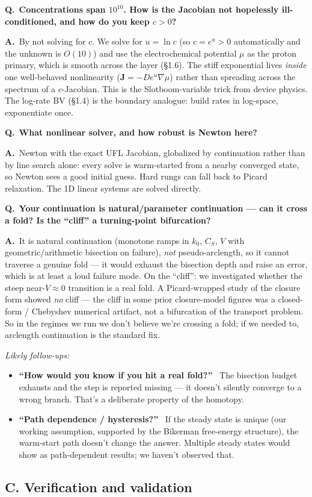 \documentclass[11pt]{article}
\newcommand{\CS}{C_{S}}
\newcommand{\Jbf}{\mathbf{J}}
\newcommand{\Q}[1]{\medskip\par\noindent\textcolor{qcol}{\textbf{Q.}}\ \textbf{#1}\par\nopagebreak\smallskip}
\newcommand{\A}{\noindent\textbf{A.}\ \ignorespaces}
\newenvironment{followups}{\par\smallskip\noindent\emph{Likely follow-ups:}\begin{itemize}[leftmargin=1.6em,topsep=1pt]}{\end{itemize}}
\newcommand{\fu}[1]{\item \textbf{``#1''}\ }
\begin{document}
\Q{Concentrations span $10^{10}$. How is the Jacobian not hopelessly
ill-conditioned, and how do you keep $c>0$?}
\A By not solving for $c$. We solve for $u=\ln c$ (so $c=e^u>0$
automatically and the unknown is $O(10)$) and use the electrochemical
potential $\mu$ as the proton primary, which is smooth across the layer
(\S1.6). The stiff exponential lives \emph{inside} one well-behaved
nonlinearity ($\Jbf=-De^{u}\nabla\mu$) rather than spreading across the
spectrum of a $c$-Jacobian. This is the Slotboom-variable trick from device
physics. The log-rate BV (\S1.4) is the boundary analogue: build rates in
log-space, exponentiate once.

\Q{What nonlinear solver, and how robust is Newton here?}
\A Newton with the exact UFL Jacobian, globalized by continuation rather than
by line search alone: every solve is warm-started from a nearby converged
state, so Newton sees a good initial guess. Hard rungs can fall back to
Picard relaxation. The 1D linear systems are solved directly.

\Q{Your continuation is natural/parameter continuation --- can it cross a
fold? Is the ``cliff'' a turning-point bifurcation?}
\A It is natural continuation (monotone ramps in $k_0$, $\CS$, $V$ with
geometric/arithmetic bisection on failure), \emph{not} pseudo-arclength, so
it cannot traverse a genuine fold --- it would exhaust the bisection depth
and raise an error, which is at least a loud failure mode. On the ``cliff'':
we investigated whether the steep near-$V\!\approx\!0$ transition is a real
fold. A Picard-wrapped study of the closure form showed \emph{no} cliff ---
the cliff in some prior closure-model figures was a closed-form / Chebyshev
numerical artifact, not a bifurcation of the transport problem. So in the
regimes we run we don't believe we're crossing a fold; if we needed to,
arclength continuation is the standard fix.
\begin{followups}
\fu{How would you know if you hit a real fold?} The bisection budget
exhausts and the step is reported missing --- it doesn't silently converge to
a wrong branch. That's a deliberate property of the homotopy.
\fu{Path dependence / hysteresis?} If the steady state is unique (our
working assumption, supported by the Bikerman free-energy structure), the
warm-start path doesn't change the answer. Multiple steady states would show
as path-dependent results; we haven't observed that.
\end{followups}

\subsection*{C. Verification and validation}
\end{document}
